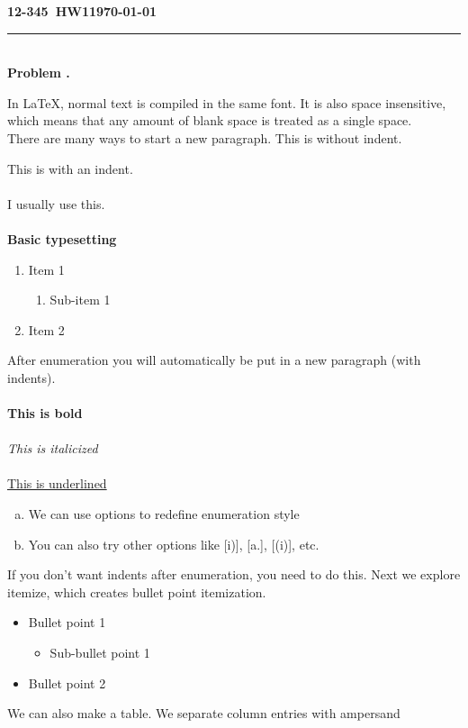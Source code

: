 \documentclass[11pt,a4paper]{article}
\newcommand{\hwnum}{1}
\newcommand{\coursenum}{12-345}
\newcounter{problem}
\newcommand\Problem{
  \stepcounter{problem}
  {\large \textbf{Problem \theproblem.}~}
}
\begin{document}
\textbf{\coursenum \ HW\hwnum \hfill \today}\\
\noindent\rule{\textwidth}{1pt} \\
\Problem 
In \LaTeX, normal text is compiled in the same font. It is also space insensitive, which means that any amount of blank space
is
        treated
                as a single
                        space. \\
There are many ways to start a new paragraph. This is without indent. \\
\par
This is with an indent. \\\\
I usually use this. \\\\
\textbf{Basic typesetting}
\begin{enumerate}
    \item 
    Item 1
    \begin{enumerate}
        \item 
        Sub-item 1
    \end{enumerate}
    \item
    Item 2
\end{enumerate}
After enumeration you will automatically be put in a new paragraph (with indents). \\\\
\textbf{This is bold}\\\\
\textit{This is italicized}\\\\
\underline{This is underlined}
\begin{enumerate}[a)]
    \item
    We can use options to redefine enumeration style
    
    \item
    You can also try other options like [i)], [a.], [(i)], etc.
\end{enumerate}
\noindent If you don't want indents after enumeration, you need to do this. Next we explore itemize, which creates bullet point itemization. 
\begin{itemize}
    \item 
    Bullet point 1
    \begin{itemize}
        \item 
        Sub-bullet point 1
    \end{itemize}
    \item
    Bullet point 2
\end{itemize}
We can also make a table. We separate column entries with ampersand
\end{document}
